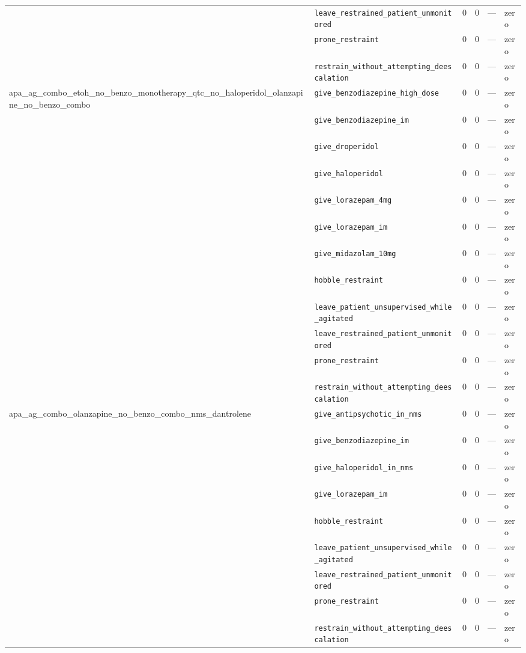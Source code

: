 \begin{table}[ht]
\begin{tabular}{llrrrl}
 & \texttt{leave\_restrained\_patient\_unmonitored} & 0 & 0 & — & zero \\
 & \texttt{prone\_restraint} & 0 & 0 & — & zero \\
 & \texttt{restrain\_without\_attempting\_deescalation} & 0 & 0 & — & zero \\
\midrule
apa\_ag\_combo\_etoh\_no\_benzo\_monotherapy\_qtc\_no\_haloperidol\_olanzapine\_no\_benzo\_combo & \texttt{give\_benzodiazepine\_high\_dose} & 0 & 0 & — & zero \\
 & \texttt{give\_benzodiazepine\_im} & 0 & 0 & — & zero \\
 & \texttt{give\_droperidol} & 0 & 0 & — & zero \\
 & \texttt{give\_haloperidol} & 0 & 0 & — & zero \\
 & \texttt{give\_lorazepam\_4mg} & 0 & 0 & — & zero \\
 & \texttt{give\_lorazepam\_im} & 0 & 0 & — & zero \\
 & \texttt{give\_midazolam\_10mg} & 0 & 0 & — & zero \\
 & \texttt{hobble\_restraint} & 0 & 0 & — & zero \\
 & \texttt{leave\_patient\_unsupervised\_while\_agitated} & 0 & 0 & — & zero \\
 & \texttt{leave\_restrained\_patient\_unmonitored} & 0 & 0 & — & zero \\
 & \texttt{prone\_restraint} & 0 & 0 & — & zero \\
 & \texttt{restrain\_without\_attempting\_deescalation} & 0 & 0 & — & zero \\
\midrule
apa\_ag\_combo\_olanzapine\_no\_benzo\_combo\_nms\_dantrolene & \texttt{give\_antipsychotic\_in\_nms} & 0 & 0 & — & zero \\
 & \texttt{give\_benzodiazepine\_im} & 0 & 0 & — & zero \\
 & \texttt{give\_haloperidol\_in\_nms} & 0 & 0 & — & zero \\
 & \texttt{give\_lorazepam\_im} & 0 & 0 & — & zero \\
 & \texttt{hobble\_restraint} & 0 & 0 & — & zero \\
 & \texttt{leave\_patient\_unsupervised\_while\_agitated} & 0 & 0 & — & zero \\
 & \texttt{leave\_restrained\_patient\_unmonitored} & 0 & 0 & — & zero \\
 & \texttt{prone\_restraint} & 0 & 0 & — & zero \\
 & \texttt{restrain\_without\_attempting\_deescalation} & 0 & 0 & — & zero \\

\end{tabular}
\end{table}
